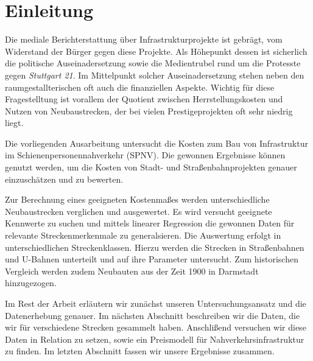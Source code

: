 \section{Einleitung}


Die mediale Berichterstattung über Infrastrukturprojekte ist gebrägt, vom
Widerstand der Bürger gegen diese Projekte. Als Höhepunkt dessen ist sicherlich
die politische Auseinadersetzung sowie die Medientrubel rund um die Protesste
gegen \emph{Stuttgart 21}. Im Mittelpunkt solcher Auseinadersetzung stehen neben
den raumgestallterischen oft auch die finanziellen Aspekte. Wichtig für diese
Fragestelltung ist vorallem der Quotient zwischen Herrstellungskosten und
Nutzen von Neubaustrecken, der bei vielen Prestigeprojekten oft sehr niedrig
liegt.

Die vorliegenden Ausarbeitung untersucht die Kosten zum Bau von Infrastruktur im
Schienenpersonennahverkehr (SPNV). Die gewonnen Ergebnisse können genutzt
werden, um die Kosten von Stadt- und Straßenbahnprojekten genauer einzuschätzen
und zu bewerten.

Zur Berechnung eines geeigneten Kostenmaßes werden unterschiedliche
Neubaustrecken verglichen und ausgewertet. Es wird versucht geeignete
Kennwerte zu suchen und mittels linearer Regression die gewonnen Daten
für relevante Streckenmerkenmale zu generalsieren. Die Auswertung erfolgt in
unterschiedlichen Streckenklassen. Hierzu werden die Strecken in Straßenbahnen
und U-Bahnen unterteilt und auf ihre Parameter untersucht. Zum historischen
Vergleich werden zudem Neubauten aus der Zeit 1900 in Darmstadt hinzugezogen.


Im Rest der Arbeit erläutern wir zunächst unseren Untersuchungsansatz und die
Datenerhebung genauer. Im nächsten Abschnitt beschreiben wir die Daten, die wir
für verschiedene Strecken gesammelt haben. Anschlißend versuchen wir diese Daten
in Relation zu setzen, sowie ein Preismodell für Nahverkehrsinfrastruktur zu
finden. Im letzten Abschnitt fassen wir unsere Ergebnisse zusammen.
